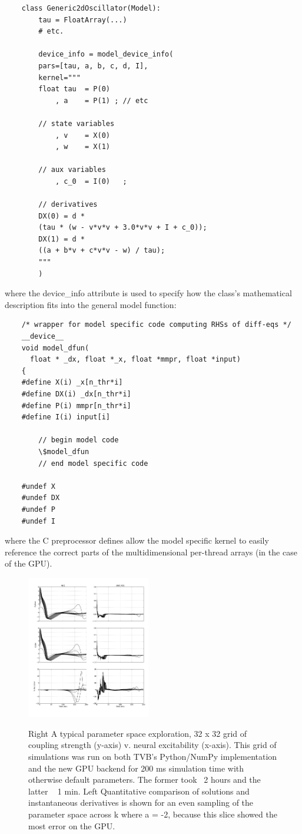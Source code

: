 	\begin{lstlisting}
	class Generic2dOscillator(Model):
	    tau = FloatArray(...)
	    # etc.

	    device_info = model_device_info(
		pars=[tau, a, b, c, d, I],
		kernel="""
		float tau  = P(0)
		    , a    = P(1) ; // etc

		// state variables
		    , v    = X(0)
		    , w    = X(1)

		// aux variables
		    , c_0  = I(0)   ;

		// derivatives
		DX(0) = d * 
		(tau * (w - v*v*v + 3.0*v*v + I + c_0));
		DX(1) = d * 
		((a + b*v + c*v*v - w) / tau);
		"""
	    )
	\end{lstlisting}

	\noindent where the device\_info attribute is used to specify how the
	class's mathematical description fits into the general model function:

	\begin{lstlisting}
	/* wrapper for model specific code computing RHSs of diff-eqs */
	__device__
	void model_dfun(
	  float * _dx, float *_x, float *mmpr, float *input)
	{
	#define X(i) _x[n_thr*i]
	#define DX(i) _dx[n_thr*i]
	#define P(i) mmpr[n_thr*i]
	#define I(i) input[i]

	    // begin model code
	    \$model_dfun
	    // end model specific code

	#undef X
	#undef DX
	#undef P
	#undef I
	\end{lstlisting}

	\noindent where the C preprocessor defines allow the model specific
	kernel to easily reference the correct parts of the multidimensional 
	per-thread arrays (in the case of the GPU). 

	 \begin{figure}
		{\includegraphics[width=0.48\textwidth]{images/gpu_dxdt.png}}
		\caption{
		Right A typical parameter space exploration, 32 x 32 grid of
		coupling strength (y-axis) v. neural excitability (x-axis).
		This grid of simulations was run on both TVB's Python/NumPy
		implementation and the new GPU backend for 200 ms simulation
		time with otherwise default parameters. The former took ~2
		hours and the latter ~ 1 min. Left Quantitative comparison of
		solutions and instantaneous derivatives is shown for an even
		sampling of the parameter space across k where a = -2, because
		this slice showed the most error on the GPU. 	
		}
		\label{fig:gpu_dxdt}
	\end{figure}

